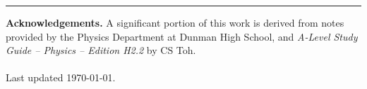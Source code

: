 \begin{titlepage}    
    \vspace*{\fill}
    \hrule
    \medbreak
    {\small
    \noindent \textbf{Acknowledgements.} A significant portion of this work is derived from notes provided by the Physics Department at Dunman High School, and \textit{A-Level Study Guide -- Physics -- Edition H2.2} by CS Toh.\\\\
    \noindent Last updated \today.
    }
\end{titlepage}